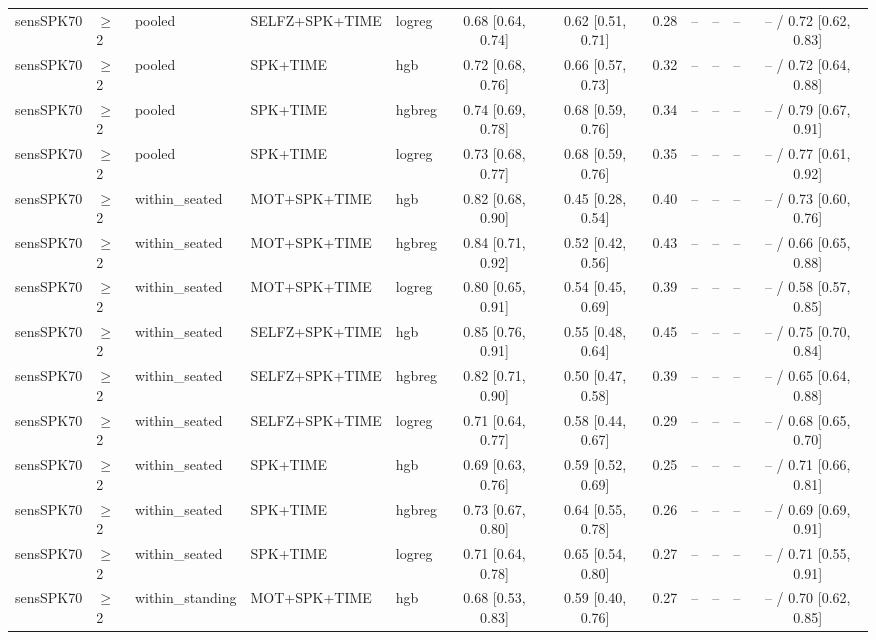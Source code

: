 \begin{longtable}{@{}lllllcccrrrc@{}}
sensSPK70 & $\geq$2 & pooled & SELFZ+SPK+TIME & logreg & 0.68 [0.64, 0.74] & 0.62 [0.51, 0.71] & 0.28 & -- & -- & -- & -- / 0.72 [0.62, 0.83] \\
sensSPK70 & $\geq$2 & pooled & SPK+TIME & hgb & 0.72 [0.68, 0.76] & 0.66 [0.57, 0.73] & 0.32 & -- & -- & -- & -- / 0.72 [0.64, 0.88] \\
sensSPK70 & $\geq$2 & pooled & SPK+TIME & hgbreg & 0.74 [0.69, 0.78] & 0.68 [0.59, 0.76] & 0.34 & -- & -- & -- & -- / 0.79 [0.67, 0.91] \\
sensSPK70 & $\geq$2 & pooled & SPK+TIME & logreg & 0.73 [0.68, 0.77] & 0.68 [0.59, 0.76] & 0.35 & -- & -- & -- & -- / 0.77 [0.61, 0.92] \\
sensSPK70 & $\geq$2 & within\_seated & MOT+SPK+TIME & hgb & 0.82 [0.68, 0.90] & 0.45 [0.28, 0.54] & 0.40 & -- & -- & -- & -- / 0.73 [0.60, 0.76] \\
sensSPK70 & $\geq$2 & within\_seated & MOT+SPK+TIME & hgbreg & 0.84 [0.71, 0.92] & 0.52 [0.42, 0.56] & 0.43 & -- & -- & -- & -- / 0.66 [0.65, 0.88] \\
sensSPK70 & $\geq$2 & within\_seated & MOT+SPK+TIME & logreg & 0.80 [0.65, 0.91] & 0.54 [0.45, 0.69] & 0.39 & -- & -- & -- & -- / 0.58 [0.57, 0.85] \\
sensSPK70 & $\geq$2 & within\_seated & SELFZ+SPK+TIME & hgb & 0.85 [0.76, 0.91] & 0.55 [0.48, 0.64] & 0.45 & -- & -- & -- & -- / 0.75 [0.70, 0.84] \\
sensSPK70 & $\geq$2 & within\_seated & SELFZ+SPK+TIME & hgbreg & 0.82 [0.71, 0.90] & 0.50 [0.47, 0.58] & 0.39 & -- & -- & -- & -- / 0.65 [0.64, 0.88] \\
sensSPK70 & $\geq$2 & within\_seated & SELFZ+SPK+TIME & logreg & 0.71 [0.64, 0.77] & 0.58 [0.44, 0.67] & 0.29 & -- & -- & -- & -- / 0.68 [0.65, 0.70] \\
sensSPK70 & $\geq$2 & within\_seated & SPK+TIME & hgb & 0.69 [0.63, 0.76] & 0.59 [0.52, 0.69] & 0.25 & -- & -- & -- & -- / 0.71 [0.66, 0.81] \\
sensSPK70 & $\geq$2 & within\_seated & SPK+TIME & hgbreg & 0.73 [0.67, 0.80] & 0.64 [0.55, 0.78] & 0.26 & -- & -- & -- & -- / 0.69 [0.69, 0.91] \\
sensSPK70 & $\geq$2 & within\_seated & SPK+TIME & logreg & 0.71 [0.64, 0.78] & 0.65 [0.54, 0.80] & 0.27 & -- & -- & -- & -- / 0.71 [0.55, 0.91] \\
sensSPK70 & $\geq$2 & within\_standing & MOT+SPK+TIME & hgb & 0.68 [0.53, 0.83] & 0.59 [0.40, 0.76] & 0.27 & -- & -- & -- & -- / 0.70 [0.62, 0.85] \\

\end{longtable}
